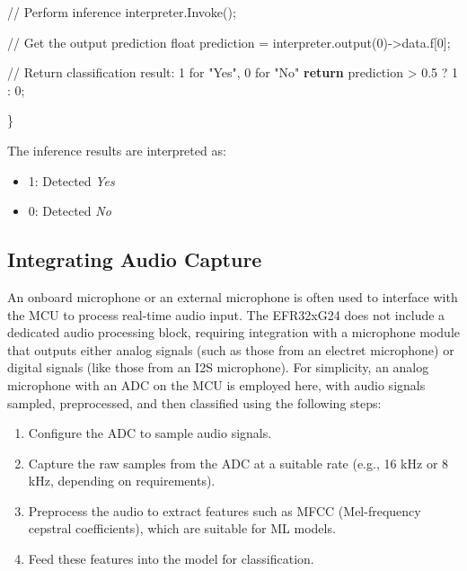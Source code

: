 \documentclass[
  9pt,
  letterpaper,
  abstract,
  titlepage]{scrbook}
\newenvironment{Shaded}{\begin{snugshade}}{\end{snugshade}}
\newcommand{\CommentTok}[1]{\textcolor[rgb]{0.37,0.37,0.37}{#1}}
\newcommand{\ControlFlowTok}[1]{\textcolor[rgb]{0.00,0.23,0.31}{\textbf{#1}}}
\newcommand{\DataTypeTok}[1]{\textcolor[rgb]{0.68,0.00,0.00}{#1}}
\newcommand{\DecValTok}[1]{\textcolor[rgb]{0.68,0.00,0.00}{#1}}
\newcommand{\FloatTok}[1]{\textcolor[rgb]{0.68,0.00,0.00}{#1}}
\newcommand{\NormalTok}[1]{\textcolor[rgb]{0.00,0.23,0.31}{#1}}
\newcommand{\OperatorTok}[1]{\textcolor[rgb]{0.37,0.37,0.37}{#1}}
\begin{document}
\begin{Shaded}
\begin{Highlighting}[]
    \CommentTok{// Perform inference}
\NormalTok{    interpreter}\OperatorTok{.}\NormalTok{Invoke}\OperatorTok{();}

    \CommentTok{// Get the output prediction}
    \DataTypeTok{float}\NormalTok{ prediction }\OperatorTok{=}\NormalTok{ interpreter}\OperatorTok{.}\NormalTok{output}\OperatorTok{(}\DecValTok{0}\OperatorTok{){-}\textgreater{}}\NormalTok{data}\OperatorTok{.}\NormalTok{f}\OperatorTok{[}\DecValTok{0}\OperatorTok{];}

    \CommentTok{// Return classification result: 1 for "Yes", 0 for "No"}
    \ControlFlowTok{return}\NormalTok{ prediction }\OperatorTok{\textgreater{}} \FloatTok{0.5} \OperatorTok{?} \DecValTok{1} \OperatorTok{:} \DecValTok{0}\OperatorTok{;}

\OperatorTok{\}}
\end{Highlighting}
\end{Shaded}

The inference results are interpreted as:

\begin{itemize}
\item
  1: Detected \emph{Yes}
\item
  0: Detected \emph{No}
\end{itemize}

\subsection{Integrating Audio Capture}\label{integrating-audio-capture}

An onboard microphone or an external microphone is often used to
interface with the MCU to process real-time audio input. The EFR32xG24
does not include a dedicated audio processing block, requiring
integration with a microphone module that outputs either analog signals
(such as those from an electret microphone) or digital signals (like
those from an I2S microphone). For simplicity, an analog microphone with
an ADC on the MCU is employed here, with audio signals sampled,
preprocessed, and then classified using the following steps:

\begin{enumerate}
\def\labelenumi{\arabic{enumi}.}
\item
  Configure the ADC to sample audio signals.
\item
  Capture the raw samples from the ADC at a suitable rate (e.g., 16 kHz
  or 8 kHz, depending on requirements).
\item
  Preprocess the audio to extract features such as MFCC (Mel-frequency
  cepstral coefficients), which are suitable for ML models.
\item
  Feed these features into the model for classification.
\end{enumerate}
\end{document}
